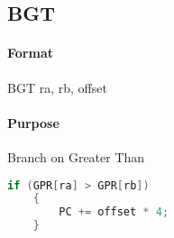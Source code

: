 \subsection{BGT}


\paragraph{Format} BGT ra, rb, offset

\paragraph{Purpose} Branch on Greater Than

\begin{lstlisting}[language=c]
    if (GPR[ra] > GPR[rb])
    {
        PC += offset * 4;
    }
\end{lstlisting}
